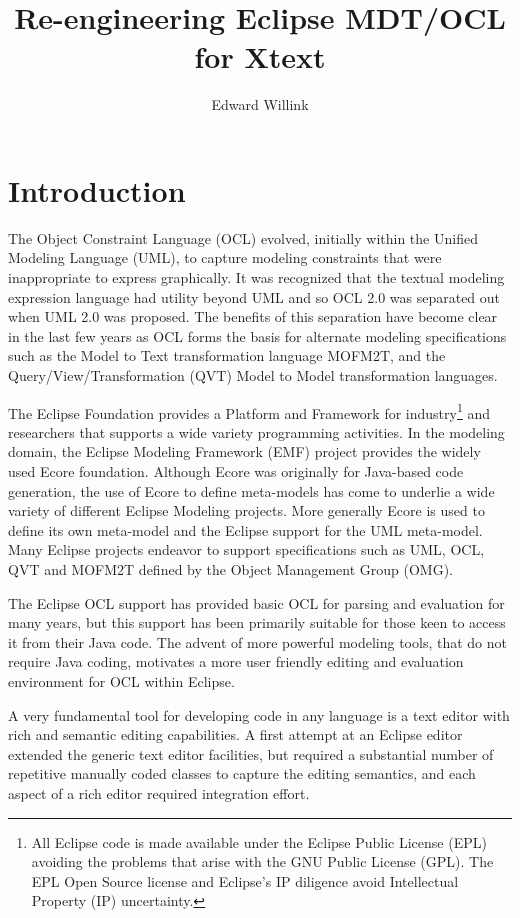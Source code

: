 \documentclass{eceasst}
\title{%
Re-engineering Eclipse MDT/OCL for Xtext}
\author{%
Edward Willink\autref{1}}
\institute{%
\autlabel{1} \email{ed \_at\_ willink.me.uk}, \url{http://www.eclipse.org/modeling}\\
Eclipse Modeling Project}
\begin{document}
\maketitle

\section{Introduction}

The Object Constraint Language (OCL)\cite{OCL} evolved, initially within the Unified Modeling Language (UML)\cite{UML}, to capture modeling constraints that were inappropriate to express graphically. It was recognized that the textual modeling expression language had utility beyond UML and so OCL 2.0 was separated out when UML 2.0 was proposed. The benefits of this separation have become clear in the last few years as OCL forms the basis for alternate modeling specifications such as the Model to Text transformation language MOFM2T\cite{MOFM2T}, and the Query/View/Transformation (QVT)\cite{QVT} Model to Model transformation languages.

The Eclipse Foundation provides a Platform and Framework for industry\footnote{All Eclipse code is made available under the Eclipse Public License (EPL) avoiding the problems that arise with the GNU Public License (GPL). The EPL Open Source license and Eclipse's IP diligence avoid Intellectual Property (IP) uncertainty.} and researchers that supports a wide variety programming activities.  In the modeling domain, the Eclipse Modeling Framework (EMF) project provides the widely used Ecore foundation. Although Ecore was originally for Java-based code generation, the use of Ecore to define meta-models has come to underlie a wide variety of different Eclipse Modeling projects. More generally Ecore is used to define its own meta-model and the Eclipse support for the UML meta-model. Many Eclipse projects endeavor to support specifications such as UML, OCL, QVT and MOFM2T defined by the Object Management Group (OMG).

The Eclipse OCL\cite{MDT/OCL} support has provided basic OCL for parsing and evaluation for many years, but this support has been primarily suitable for those keen to access it from their Java code. The advent of more powerful modeling tools, that do not require Java coding, motivates a more user friendly editing and evaluation environment for OCL within Eclipse.

A very fundamental tool for developing code in any language is a text editor with rich and semantic editing capabilities.
A first attempt at an Eclipse editor extended the generic text editor facilities, but required a substantial number of repetitive manually coded classes to capture the editing semantics, and each aspect of a rich editor required integration effort.
\end{document}
